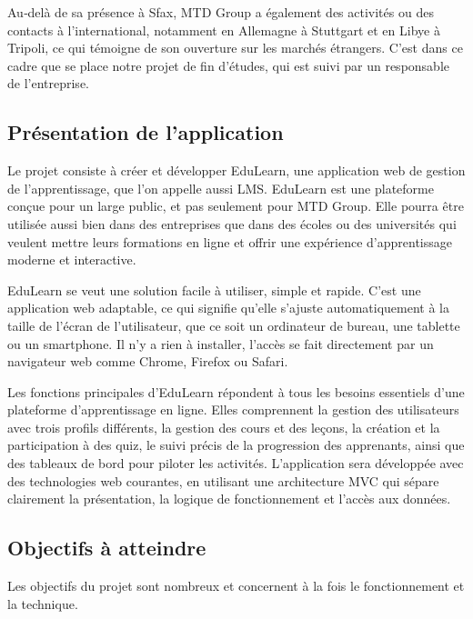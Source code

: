 \documentclass[12pt,a4paper]{report}
\begin{document}
Au‑delà de sa présence à Sfax, MTD Group a également des activités ou des contacts à l'international, notamment en Allemagne à Stuttgart et en Libye à Tripoli, ce qui témoigne de son ouverture sur les marchés étrangers. C'est dans ce cadre que se place notre projet de fin d'études, qui est suivi par un responsable de l'entreprise.

\subsection{Présentation de l'application}
Le projet consiste à créer et développer EduLearn, une application web de gestion de l'apprentissage, que l'on appelle aussi LMS. EduLearn est une plateforme conçue pour un large public, et pas seulement pour MTD Group. Elle pourra être utilisée aussi bien dans des entreprises que dans des écoles ou des universités qui veulent mettre leurs formations en ligne et offrir une expérience d'apprentissage moderne et interactive.

EduLearn se veut une solution facile à utiliser, simple et rapide. C'est une application web adaptable, ce qui signifie qu'elle s'ajuste automatiquement à la taille de l'écran de l'utilisateur, que ce soit un ordinateur de bureau, une tablette ou un smartphone. Il n'y a rien à installer, l'accès se fait directement par un navigateur web comme Chrome, Firefox ou Safari.

Les fonctions principales d'EduLearn répondent à tous les besoins essentiels d'une plateforme d'apprentissage en ligne. Elles comprennent la gestion des utilisateurs avec trois profils différents, la gestion des cours et des leçons, la création et la participation à des quiz, le suivi précis de la progression des apprenants, ainsi que des tableaux de bord pour piloter les activités. L'application sera développée avec des technologies web courantes, en utilisant une architecture MVC qui sépare clairement la présentation, la logique de fonctionnement et l'accès aux données.

\subsection{Objectifs à atteindre}
Les objectifs du projet sont nombreux et concernent à la fois le fonctionnement et la technique.
\end{document}
